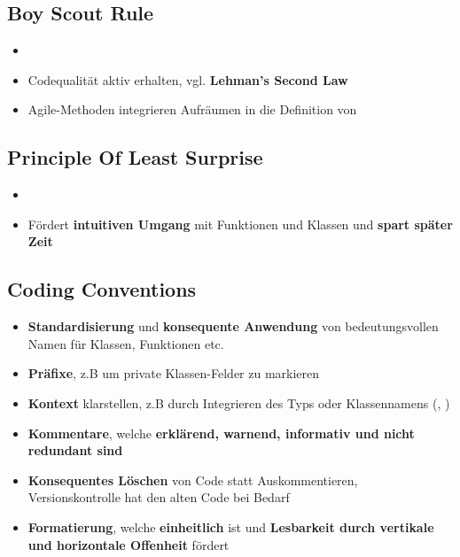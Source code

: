 \subsection{Boy Scout Rule}
\label{cc:sub:boy_scout_rule}

\begin{itemize}
	\item {}
	\item Codequalität aktiv erhalten, vgl. \textbf{Lehman's Second Law}
	\item Agile-Methoden integrieren Aufräumen in die Definition von 
\end{itemize}

\subsection{Principle Of Least Surprise}
\label{cc:sub:principle_of_least_surprise}

\begin{itemize}
	\item {}
	\item Fördert \textbf{intuitiven Umgang} mit Funktionen und Klassen und \textbf{spart später Zeit}
\end{itemize}

\subsection{Coding Conventions}
\label{cc:sub:coding_conventions}

\begin{itemize}
	\item \textbf{Standardisierung} und \textbf{konsequente Anwendung} von bedeutungsvollen Namen für Klassen, Funktionen etc.
	\item \textbf{Präfixe}, z.B um private Klassen-Felder zu markieren
	\item \textbf{Kontext} klarstellen, z.B durch Integrieren des Typs oder Klassennamens (, )
	\item \textbf{Kommentare}, welche \textbf{erklärend, warnend, informativ und nicht redundant sind}
	\item \textbf{Konsequentes Löschen} von Code statt Auskommentieren, Versionskontrolle hat den alten Code bei Bedarf
	\item \textbf{Formatierung}, welche \textbf{einheitlich} ist und \textbf{Lesbarkeit durch vertikale und horizontale Offenheit} fördert
\end{itemize}

